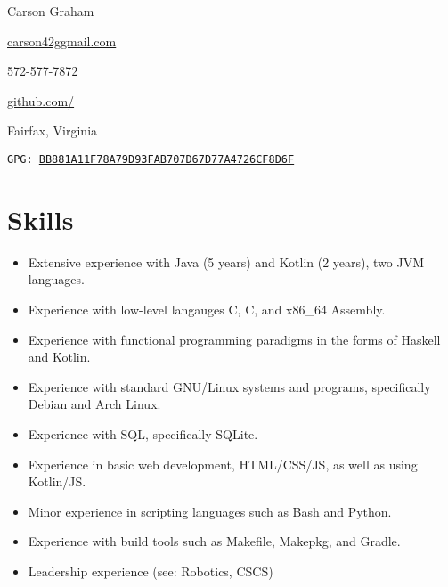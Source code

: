 \documentclass[10pt,letterpaper]{article}
\makeatletter
\def\link#1#2{\color{blue!60!black}\href{#1}{#2}\color{black}}
\newcommand{\CPP}
{C\nolinebreak[4]\hspace{-.05em}\raisebox{.35ex}{\footnotesize\bf ++}}
\newcommand{\email}
{carson42g\raisebox{-0.2ex}{@}gmail.com}
\newcommand{\github}
{github.com\hspace{-0.007em}/\hspace{-0.05em}{mee42}}
\def\code#1{\texttt{#1}}
\def\paddedItem#1{\vspace{-0.4em}\item #1}
\makeatother
\begin{document}
    \thispagestyle{empty}
    \begin{center}
        \huge Carson Graham
    \end{center}

    \begin{adjustwidth}{0em}{0em}
        \begin{multicols}{4}
            \begin{center}
                \link{mailto:carson42g@gmail.com}{\email}
            \end{center}
            \columnbreak
            \begin{center}
                572-577-7872
            \end{center}
            \columnbreak
            \begin{center}
                \link{https://github.com/mee42/}{\github}
            \end{center}
            \columnbreak
            \begin{center}
                Fairfax, Virginia
            \end{center}
        \end{multicols}
    \end{adjustwidth}
    \vspace{-1em}
    \begin{center}
        \code{GPG: \link{https://keys.openpgp.org/search?q=BB881A11F78A79D93FAB707D67D77A4726CF8D6F}{BB881A11F78A79D93FAB707D67D77A4726CF8D6F}}
     \end{center}

        

    \section*{Skills}

    \begin{itemize}
        \paddedItem Extensive experience with Java (5 years) and Kotlin (2 years), two JVM languages.
        \paddedItem Experience with low-level langauges C, \CPP, and x86\_64 Assembly.
        \paddedItem Experience with functional programming paradigms in the forms of Haskell and Kotlin.
        \paddedItem Experience with standard GNU/Linux systems and programs, specifically Debian and Arch Linux.
        \paddedItem Experience with SQL, specifically SQLite.
        \paddedItem Experience in basic web development, HTML/CSS/JS, as well as using Kotlin/JS.
        \paddedItem Minor experience in scripting languages such as Bash and Python.
        \paddedItem Experience with build tools such as Makefile, Makepkg, and Gradle.
        \paddedItem Leadership experience (see: Robotics, CSCS)
    \end{itemize}
\end{document}

